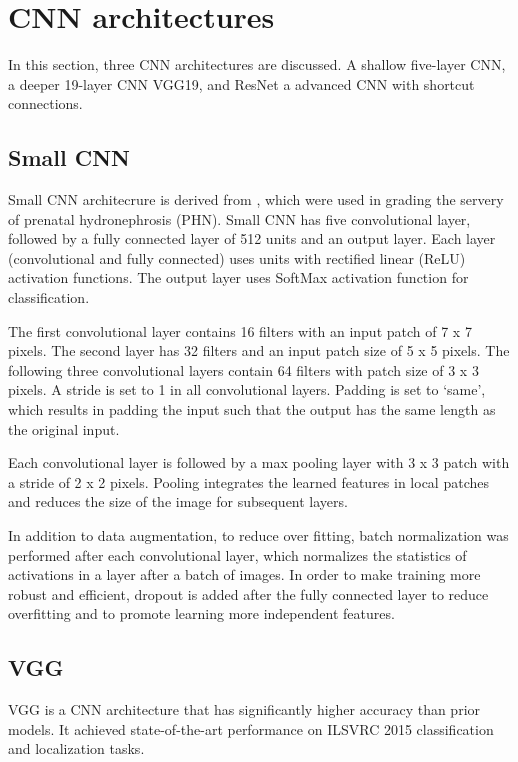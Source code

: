 \chapter{CNN architectures} 

In this section, three CNN architectures are discussed. A shallow five-layer CNN, a deeper 19-layer CNN VGG19, and  ResNet a advanced CNN with shortcut connections.

\section{Small CNN}
Small CNN architecrure is derived from \cite{Dhindsa2018}, which were used in grading the servery of prenatal hydronephrosis (PHN). Small CNN has five convolutional layer, followed by a fully connected layer of 512 units and an output layer. Each layer (convolutional and fully connected) uses units with rectified linear (ReLU) activation functions. The output layer uses SoftMax activation function for classification. 

The first convolutional layer contains 16 filters with an input patch of 7 x 7 pixels. The second layer has 32 filters and an input patch size of 5 x 5 pixels. The following three convolutional layers contain 64 filters with patch size of 3 x 3 pixels. A stride is set to 1 in all convolutional layers. Padding is set to ‘same’, which results in padding the input such that the output has the same length as the original input.

Each convolutional layer is followed by a max pooling layer with 3 x 3 patch with a stride of 2 x 2 pixels. Pooling integrates the learned features in local patches and reduces the size of the image for subsequent layers. 

In addition to data augmentation, to reduce over fitting, batch normalization was performed after each convolutional layer, which normalizes the statistics of activations in a layer after a batch of images. In order to make training more robust and efficient, dropout is added after the fully connected layer to reduce overfitting and to promote learning more independent features.

\section{VGG}
VGG \citep{vgg} is a CNN architecture that has significantly higher accuracy than prior models. It achieved state-of-the-art performance on ILSVRC 2015 classification and localization tasks. 


